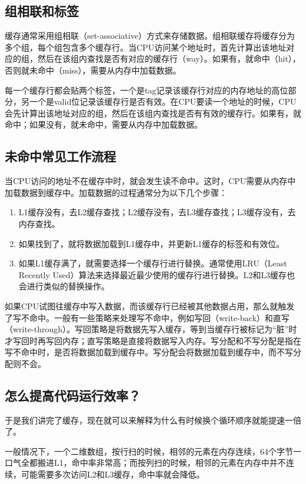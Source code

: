\subsection{组相联和标签}

缓存通常采用组相联（set-associative）方式来存储数据。组相联缓存将缓存分为多个组，每个组包含多个缓存行。当CPU访问某个地址时，首先计算出该地址对应的组，然后在该组内查找是否有对应的缓存行（way）。如果有，就命中（hit），否则就未命中（miss），需要从内存中加载数据。

每一个缓存行都会贴两个标签，一个是tag记录该缓存行对应的内存地址的高位部分，另一个是valid位记录该缓存行是否有效。在CPU要读一个地址的时候，CPU会先计算出该地址对应的组，然后在该组内查找是否有有效的缓存行。如果有，就命中；如果没有，就未命中，需要从内存中加载数据。

\subsection{未命中常见工作流程}

当CPU访问的地址不在缓存中时，就会发生读不命中。这时，CPU需要从内存中加载数据到缓存中。加载数据的过程通常分为以下几个步骤：
\begin{enumerate}
  \item L1缓存没有，去L2缓存查找；L2缓存没有，去L3缓存查找；L3缓存没有，去内存查找。
  \item 如果找到了，就将数据加载到L1缓存中，并更新L1缓存的标签和有效位。
  \item 如果L1缓存满了，就需要选择一个缓存行进行替换。通常使用LRU（Least Recently Used）算法来选择最近最少使用的缓存行进行替换。L2和L3缓存也会进行类似的替换操作。
\end{enumerate}

如果CPU试图往缓存中写入数据，而该缓存行已经被其他数据占用，那么就触发了写不命中。一般有一些策略来处理写不命中，例如写回（write-back）和直写（write-through）。写回策略是将数据先写入缓存，等到当缓存行被标记为“脏”时才写回时再写回内存；直写策略是直接将数据写入内存。写分配和不写分配是指在写不命中时，是否将数据加载到缓存中。写分配会将数据加载到缓存中，而不写分配则不会。

\subsection{怎么提高代码运行效率？}
于是我们讲完了缓存，现在就可以来解释为什么有时候换个循环顺序就能提速一倍了。

一般情况下，一个二维数组，按行扫的时候，相邻的元素在内存连续，64个字节一口气全都搬进L1，命中率非常高；而按列扫的时候，相邻的元素在内存中并不连续，可能需要多次访问L2和L3缓存，命中率就会降低。

